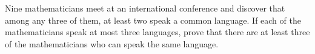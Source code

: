 Nine mathematicians meet at an international conference and discover that among any three of them, at least two speak a common language. If each of the mathematicians speak at most three languages, prove that there are at least three of the mathematicians who can speak the same language.